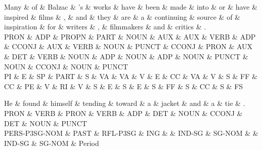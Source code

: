 \begin{dependency}
\begin{deptext}
Many \& of \& Balzac \& 's \& works \& have \& been \& made \& into \& or \& have \& inspired \& films \& , \& and \& they \& are \& a \& continuing \& source \& of \& inspiration \& for \& writers \& , \& filmmakers \& and \& critics \& . \\
PRON \& ADP \& PROPN \& PART \& NOUN \& AUX \& AUX \& VERB \& ADP \& CCONJ \& AUX \& VERB \& NOUN \& PUNCT \& CCONJ \& PRON \& AUX \& DET \& VERB \& NOUN \& ADP \& NOUN \& ADP \& NOUN \& PUNCT \& NOUN \& CCONJ \& NOUN \& PUNCT \\
PI \& E \& SP \& PART \& S \& VA \& VA \& V \& E \& CC \& VA \& V \& S \& FF \& CC \& PE \& V \& RI \& V \& S \& E \& S \& E \& S \& FF \& S \& CC \& S \& FS \\
\end{deptext}



\end{dependency}

\begin{dependency}
\begin{deptext}
He \& found \& himself \& tending \& toward \& a \& jacket \& and \& a \& tie \& . \\
PRON \& VERB \& PRON \& VERB \& ADP \& DET \& NOUN \& CCONJ \& DET \& NOUN \& PUNCT \\
PERS-P3SG-NOM \& PAST \& RFL-P3SG \& ING \&  \& IND-SG \& SG-NOM \&  \& IND-SG \& SG-NOM \& Period \\
\end{deptext}



\end{dependency}

